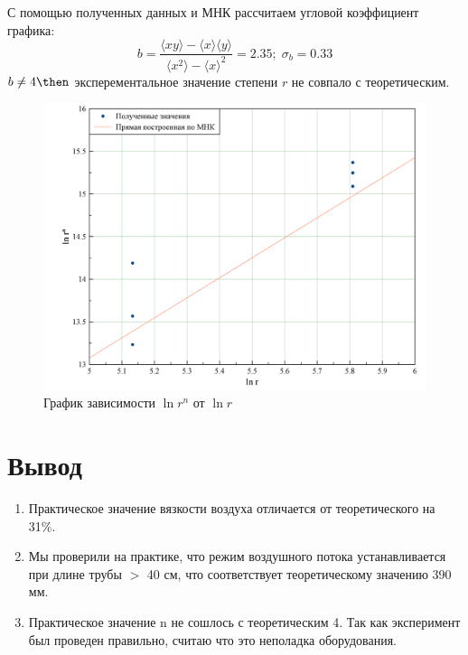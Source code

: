 \documentclass{letnab}
\begin{document}
	С помощью полученных данных и МНК рассчитаем угловой коэффициент графика:
	\begin{equation}
	b = \frac{\langle xy\rangle - \langle x \rangle \langle y \rangle }{\langle x^2 \rangle - \langle x \rangle^2} = 2.35;\; \sigma_b = 0.33
	\end{equation}
$b \ne 4 \then$ эксперементальное значение степени $r$ не совпало с теоретическим.
\begin{figure}[H]
	\includegraphics[width = 170 mm]{4.png}
	\caption{График зависимости $\ln r^n $ от $\ln r$}
\end{figure}
\section{Вывод}
\begin{enumerate}
	\item Практическое значение вязкости воздуха отличается от теоретического на 31\%.
	\item Мы проверили на практике, что режим воздушного потока устанавливается при длине трубы $>$ 40 см, что соответствует теоретическому значению 390 мм.
	\item Практическое значение n не сошлось с теоретическим 4. Так как эксперимент был проведен правильно, считаю что это неполадка оборудования.
\end{enumerate}
\end{document}
